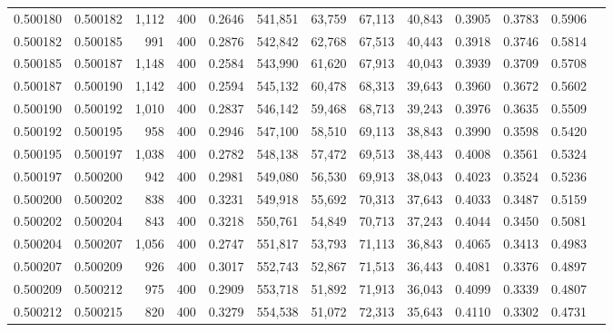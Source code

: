 \begin{tabular}{rrrrrrrrrrrrr}
0.500180 & 0.500182 &  1,112 & 400 &                                     0.2646 & 541,851 &  63,759 &  67,113 &  40,843 & 0.3905 & 0.3783 & 0.5906 \\
0.500182 & 0.500185 &    991 & 400 &                                     0.2876 & 542,842 &  62,768 &  67,513 &  40,443 & 0.3918 & 0.3746 & 0.5814 \\
0.500185 & 0.500187 &  1,148 & 400 &                                     0.2584 & 543,990 &  61,620 &  67,913 &  40,043 & 0.3939 & 0.3709 & 0.5708 \\
0.500187 & 0.500190 &  1,142 & 400 &                                     0.2594 & 545,132 &  60,478 &  68,313 &  39,643 & 0.3960 & 0.3672 & 0.5602 \\
0.500190 & 0.500192 &  1,010 & 400 &                                     0.2837 & 546,142 &  59,468 &  68,713 &  39,243 & 0.3976 & 0.3635 & 0.5509 \\
0.500192 & 0.500195 &    958 & 400 &                                     0.2946 & 547,100 &  58,510 &  69,113 &  38,843 & 0.3990 & 0.3598 & 0.5420 \\
0.500195 & 0.500197 &  1,038 & 400 &                                     0.2782 & 548,138 &  57,472 &  69,513 &  38,443 & 0.4008 & 0.3561 & 0.5324 \\
0.500197 & 0.500200 &    942 & 400 &                                     0.2981 & 549,080 &  56,530 &  69,913 &  38,043 & 0.4023 & 0.3524 & 0.5236 \\
0.500200 & 0.500202 &    838 & 400 &                                     0.3231 & 549,918 &  55,692 &  70,313 &  37,643 & 0.4033 & 0.3487 & 0.5159 \\
0.500202 & 0.500204 &    843 & 400 &                                     0.3218 & 550,761 &  54,849 &  70,713 &  37,243 & 0.4044 & 0.3450 & 0.5081 \\
0.500204 & 0.500207 &  1,056 & 400 &                                     0.2747 & 551,817 &  53,793 &  71,113 &  36,843 & 0.4065 & 0.3413 & 0.4983 \\
0.500207 & 0.500209 &    926 & 400 &                                     0.3017 & 552,743 &  52,867 &  71,513 &  36,443 & 0.4081 & 0.3376 & 0.4897 \\
0.500209 & 0.500212 &    975 & 400 &                                     0.2909 & 553,718 &  51,892 &  71,913 &  36,043 & 0.4099 & 0.3339 & 0.4807 \\
0.500212 & 0.500215 &    820 & 400 &                                     0.3279 & 554,538 &  51,072 &  72,313 &  35,643 & 0.4110 & 0.3302 & 0.4731 \\

\end{tabular}
